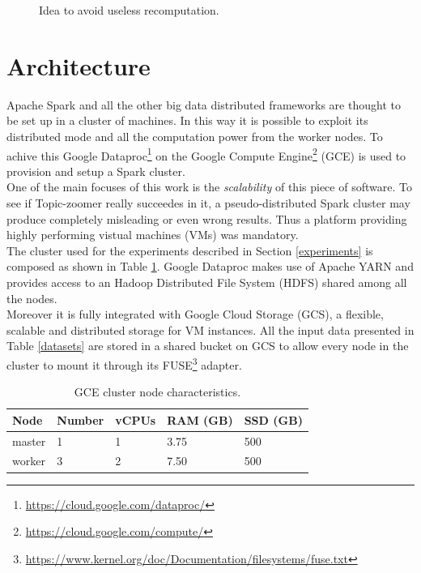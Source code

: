 \documentclass{sig-alternate-05-2015}
\begin{document}
\begin{figure}[t]
  \caption{Idea to avoid useless recomputation.}
  \label{recomputation}
\end{figure}

\section{Architecture}
Apache Spark and all the other big data distributed frameworks are thought to be set up in a cluster of machines. In this way it is possible to exploit its distributed mode and all the computation power from the worker nodes. To achive this Google Dataproc\footnote{\url{https://cloud.google.com/dataproc/}} on the Google Compute Engine\footnote{\url{https://cloud.google.com/compute/}} (GCE) is used to provision and setup a Spark cluster.\\

One of the main focuses of this work is the \emph{scalability} of this piece of software. To see if Topic-zoomer really succeedes in it, a pseudo-distributed Spark cluster may produce completely misleading or even wrong results. Thus a platform providing highly performing vistual machines (VMs) was mandatory.\\
The cluster used for the experiments described in Section \ref{experiments} is composed as shown in Table \ref{cluster}. Google Dataproc makes use of Apache YARN and provides access to an Hadoop Distributed File System (HDFS) shared among all the nodes.\\
Moreover it is fully integrated with Google Cloud Storage (GCS), a flexible, scalable and distributed storage for VM instances. All the input data presented in Table \ref{datasets} are stored in a shared bucket on GCS to allow every node in the cluster to mount it through its FUSE\footnote{\url{https://www.kernel.org/doc/Documentation/filesystems/fuse.txt}} adapter.  

\begin{table}[]
    \centering
    \caption{GCE cluster node characteristics.}
    \label{cluster}
    \begin{tabular}{lllll}
    \hline
    Node   & Number & vCPUs & RAM (GB) & SSD (GB) \\
    \hline
    master & 1      & 1     & 3.75     & 500      \\
    worker & 3      & 2     & 7.50     & 500     
    \end{tabular}
\end{table}
\end{document}
